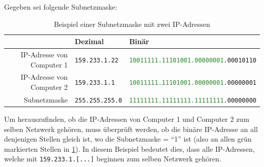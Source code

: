 \begin{myexample}[Subnetzmasken]\label{example:subnet}
Gegeben sei folgende Subnetzmaske:
\begin{table}[H]
	\centering
	\begin{tabular}{r|l|l}
		                                     & Dezimal                & Binär                                                                 \\\midrule\midrule
		\acrshort{IP}-Adresse von Computer 1 & \texttt{159.233.1.22}  & \texttt{\textcolor{ForestGreen}{10011111.11101001.00000001}.00010110} \\\midrule
		\acrshort{IP}-Adresse von Computer 2 & \texttt{159.233.1.1}   & \texttt{\textcolor{ForestGreen}{10011111.11101001.00000001}.00000001} \\\midrule
		Subnetzmaske                         & \texttt{255.255.255.0} & \texttt{\textcolor{ForestGreen}{11111111.11111111.11111111}.00000000}
	\end{tabular}
	\caption{Beispiel einer Subnetzmaske mit zwei IP-Adressen}
	\label{table:ex-subnet}
\end{table}
Um herauszufinden, ob die IP-Adressen von Computer 1 und Computer 2 zum selben Netzwerk gehören, muss überprüft werden, ob die binäre IP-Adresse an all denjenigen Stellen gleich ist, wo die Subnetzmaske = \enquote{1} ist (also an allen grün markierten Stellen in \cref{table:ex-subnet}). In diesem Beispiel bedeutet dies, dass alle \gls{IP}-Adressen, welche mit \texttt{159.233.1.[...]} beginnen zum selben Netzwerk gehören.
\end{myexample}


